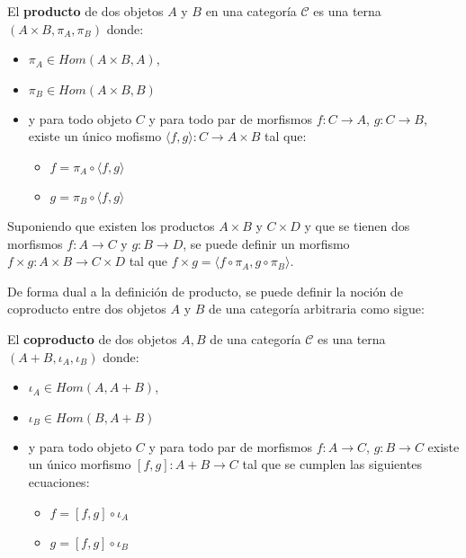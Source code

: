 \begin{definition}[Producto]
El \textbf{producto} de dos objetos $A$ y $B$ en una categoría $\mathscr{C}$ es una terna $(A \times B, \pi_A, \pi_B)$ donde:
\begin{itemize}[label=$\blacktriangleright$]
	\item $\pi_A \in Hom(A \times B, A)$,
	\item $\pi_B \in Hom(A \times B, B)$
	\item y para todo objeto $C$ y para todo par de morfismos $f : C \rightarrow A$, $g : C \rightarrow B$, existe un único mofismo $\langle f, g \rangle : C \rightarrow A \times B$ tal que:
	\begin{itemize}[label=$\bullet$]
		\item $f = \pi_A \circ \langle f, g \rangle$
		\item $g = \pi_B \circ \langle f, g \rangle$
	\end{itemize}
\end{itemize}
\end{definition}

Suponiendo que existen los productos $A \times B$ y $C \times D$ y que se tienen dos morfismos $f : A \rightarrow C$ y $g : B \rightarrow D$, se puede definir un morfismo $f \times g : A \times B \rightarrow C \times D$ tal que $f \times g = \langle f \circ \pi_A , g \circ \pi_B \rangle$.

De forma dual a la definición de producto, se puede definir la noción de coproducto entre dos objetos $A$ y $B$ de una categoría arbitraria como sigue:

\begin{definition}[Coproducto]
El \textbf{coproducto} de dos objetos $A, B$ de una categoría $\mathscr{C}$ es una terna $(A + B, \iota_A, \iota_B)$ donde:
\begin{itemize}[label=$\blacktriangleright$]
	\item $\iota_A \in Hom(A, A + B)$,
	\item $\iota_B \in Hom(B, A + B)$
	\item y para todo objeto $C$ y para todo par de morfismos $f : A \rightarrow C$, $g : B \rightarrow C$ existe un único morfismo $[f,g] : A + B \rightarrow C$ tal que se cumplen las siguientes ecuaciones:
	\begin{itemize}[label=$\bullet$]
		\item $f = [f,g] \circ \iota_A$
		\item $g = [f,g] \circ \iota_B$
	\end{itemize}
\end{itemize}
\end{definition}

